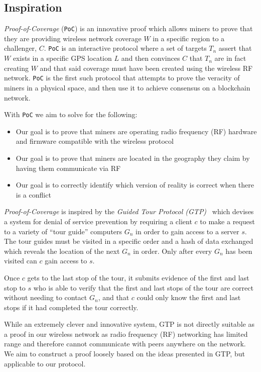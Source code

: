 \documentclass[10pt, nonatbib, nocopyrightspace, reprint]{sigplanconf}
\begin{document}
\subsection{Inspiration}

\emph{Proof-of-Coverage} (\verb|PoC|) is an innovative proof which allows miners to prove that they are providing wireless network coverage $W$ in a specific region to a challenger, $C$. \verb|PoC| is an interactive protocol where a set of targets $T_n$ assert that $W$ exists in a specific GPS location $L$ and then convinces $C$ that $T_n$ are in fact creating $W$ and that said coverage must have been created using the wireless RF network. \verb|PoC| is the first such protocol that attempts to prove the veracity of miners in a physical space, and then use it to achieve consensus on a blockchain network.

With \verb|PoC| we aim to solve for the following:

\begin{itemize}
    \item Our goal is to prove that miners are operating radio frequency (RF) hardware and firmware compatible with the wireless protocol
    \item Our goal is to prove that miners are located in the geography they claim by having them communicate via RF
    \item Our goal is to correctly identify which version of reality is correct when there is a conflict
\end{itemize}

\emph{Proof-of-Coverage} is inspired by the \emph{Guided Tour Protocol (GTP)}~\cite{gtp} which devises a system for denial of service prevention by requiring a client $c$ to make a request to a variety of ``tour guide'' computers $G_n$ in order to gain access to a server $s$. The tour guides must be visited in a specific order and a hash of data exchanged which reveals the location of the next $G_n$ in order. Only after every $G_n$ has been visited can $c$ gain access to $s$.

Once $c$ gets to the last stop of the tour, it submits evidence of the first and last stop to $s$ who is able to verify that the first and last stops of the tour are correct without needing to contact $G_n$, and that $c$ could only know the first and last stops if it had completed the tour correctly.

While an extremely clever and innovative system, GTP is not directly suitable as a proof in our wireless network as radio frequency (RF) networking has limited range and therefore cannot communicate with peers anywhere on the network. We aim to construct a proof loosely based on the ideas presented in GTP, but applicable to our protocol.
\end{document}
